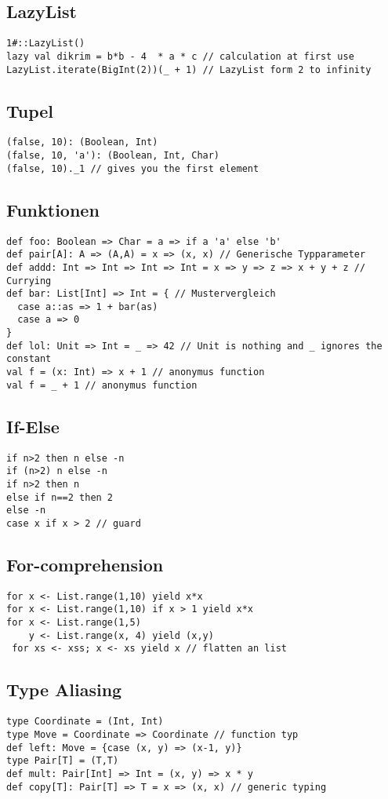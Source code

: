 \subsection{LazyList}
\begin{verbatim}
1#::LazyList()
lazy val dikrim = b*b - 4  * a * c // calculation at first use
LazyList.iterate(BigInt(2))(_ + 1) // LazyList form 2 to infinity
\end{verbatim}
\subsection{Tupel}
\begin{verbatim}
(false, 10): (Boolean, Int)
(false, 10, 'a'): (Boolean, Int, Char)
(false, 10)._1 // gives you the first element
\end{verbatim}
\subsection{Funktionen}
\begin{verbatim}
def foo: Boolean => Char = a => if a 'a' else 'b'
def pair[A]: A => (A,A) = x => (x, x) // Generische Typparameter
def addd: Int => Int => Int => Int = x => y => z => x + y + z // Currying
def bar: List[Int] => Int = { // Mustervergleich
  case a::as => 1 + bar(as)
  case a => 0
}
def lol: Unit => Int = _ => 42 // Unit is nothing and _ ignores the constant
val f = (x: Int) => x + 1 // anonymus function
val f = _ + 1 // anonymus function
\end{verbatim}
\subsection{If-Else}
\begin{verbatim}
if n>2 then n else -n
if (n>2) n else -n
if n>2 then n
else if n==2 then 2
else -n
case x if x > 2 // guard
\end{verbatim}
\subsection{For-comprehension}
\begin{verbatim}
for x <- List.range(1,10) yield x*x
for x <- List.range(1,10) if x > 1 yield x*x
for x <- List.range(1,5)
    y <- List.range(x, 4) yield (x,y)
 for xs <- xss; x <- xs yield x // flatten an list
\end{verbatim}
\subsection{Type Aliasing}
\begin{verbatim}
type Coordinate = (Int, Int)
type Move = Coordinate => Coordinate // function typ
def left: Move = {case (x, y) => (x-1, y)}
type Pair[T] = (T,T)
def mult: Pair[Int] => Int = (x, y) => x * y
def copy[T]: Pair[T] => T = x => (x, x) // generic typing
\end{verbatim}
